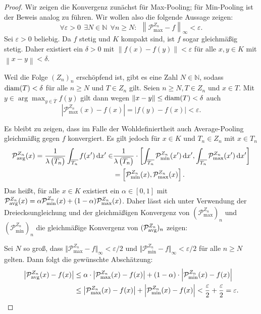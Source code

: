 \documentclass[paper=a4, 	%
		fontsize=11pt,
		abstract=true, 	%
		headsepline, 	%
		notitlepage	%
		]{scrartcl}
\theoremstyle{definition}
\newcommand{\N}{\mathbb{N}}
\newcommand{\diff}{\,\textrm{d}}
\newcommand{\norm}[1]{\left\lVert#1\right\rVert}
\newcommand{\abs}[1]{\left\lvert#1\right\rvert}
\newcommand{\avg}{\textnormal{avg}}
\newcommand{\diam}{\textnormal{diam}}
\begin{document}
\begin{proof}
    Wir zeigen die Konvergenz zunächst für Max-Pooling; für Min-Pooling ist der Beweis analog zu führen.
    Wir wollen also die folgende Aussage zeigen:
    \[\forall \varepsilon > 0 ~~ \exists N\in\N ~~ \forall n\geq N:~~\norm{\mathcal{P}^{Z_n}_{\max} - f}_{\infty} < \varepsilon.\]
    Sei $\varepsilon > 0$ beliebig. 
    Da $f$ stetig und $K$ kompakt sind, ist $f$ sogar gleichmäßig stetig.
    Daher existiert ein $\delta>0$ mit $\norm{f(x)- f(y)} < \varepsilon$ für alle $x,y\in K$ mit $\norm{x-y}< \delta$.

    Weil die Folge $(Z_n)_n$ erschöpfend ist, gibt es eine Zahl $N\in\N$, sodass $\diam(T) < \delta$ für alle $n\geq N$ und $T\in Z_n$ gilt.
    Seien $n\geq N, T\in Z_n$ und $x\in T$. Mit $y\in\arg\max_{y\in\overline{T}} f(y)$ gilt dann wegen $\norm{x-y} \leq \diam(T) < \delta$ auch
    \[
        \abs{\mathcal{P}_{\max}^{Z_n}(x) - f(x)} = \abs{f(y) - f(x)}  < \varepsilon.
    \]

    Es bleibt zu zeigen, dass im Falle der Wohldefiniertheit auch Average-Pooling gleich\-mäßig gegen $f$ konvergiert.
    Es gilt jedoch für $x\in K$ und $T_n\in Z_n$ mit $x\in T_n$
    \begin{align*}
        \mathcal{P}^{Z_n}_{\avg}(x) = \frac{1}{\lambda\left(\overline{T_n}\right)} \int_{\overline{T_n}} f(x') \diff x'
        \in &\frac{1}{\lambda\left(\overline{T_n}\right)}\cdot \left[ \int_{\overline{T_n}} \mathcal{P}^{Z_n}_{\min}(x') \diff x', \int_{\overline{T_n}} \mathcal{P}^{Z_n}_{\max}(x') \diff x'  \right] \\
        &= \left[ \mathcal{P}^{Z_n}_{\min}(x), \mathcal{P}^{Z_n}_{\max}(x)  \right].
    \end{align*}
    Das heißt, für alle $x\in K$ existiert ein $\alpha\in[0,1]$ mit $\mathcal{P}^{Z_n}_{\avg}(x) = \alpha \mathcal{P}^{Z_n}_{\min}(x) + (1-\alpha)  \mathcal{P}^{Z_n}_{\max}(x)$.
    Daher lässt sich unter Verwendung der Dreiecksungleichung und der gleichmäßigen Konvergenz von $(\mathcal{P}^{Z_n}_{\max})_n$ und $(\mathcal{P}^{Z_n}_{\min})_n$ die gleichmäßige Konvergenz von  $(\mathcal{P}^{Z_n}_{\avg})_n$ zeigen:

    Sei $N$ so groß, dass $\Vert\mathcal{P}^{Z_n}_{\max} - f\Vert_{\infty} < \varepsilon / 2$ und $\Vert\mathcal{P}^{Z_n}_{\min} - f\Vert_{\infty} < \varepsilon / 2$ für alle $n \geq N$ gelten.
    Dann folgt die gewünschte Abschätzung:
    \begin{align*}
        \abs{\mathcal{P}_{\avg}^{Z_n}(x) - f(x)}
        &\leq \alpha \cdot \abs{\mathcal{P}_{\max}^{Z_n}(x) - f(x)} + (1-\alpha) \cdot \abs{\mathcal{P}_{\min}^{Z_n}(x) - f(x)} \\
        &\leq\abs{\mathcal{P}_{\max}^{Z_n}(x) - f(x)} + \abs{\mathcal{P}_{\min}^{Z_n}(x) - f(x)} 
        < \frac{\varepsilon}{2} + \frac{\varepsilon}{2} = \varepsilon. \qedhere
    \end{align*}
\end{proof}
\end{document}
